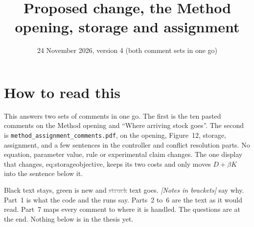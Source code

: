 \documentclass[11pt,a4paper]{article}
\title{Proposed change, the Method opening, storage and assignment}
\date{24 November 2026, version 4 (both comment sets in one go)}
\newcommand{\new}[1]{\textcolor{newc}{#1}}
\newcommand{\old}[1]{\textcolor{gray}{\sout{#1}}}
\newcommand{\note}[1]{{\small\itshape [#1]}}
\newcommand{\lab}[1]{\textsf{\footnotesize #1}}
\begin{document}
\sloppy
\maketitle

\section*{How to read this}
This answers two sets of comments in one go. The first is the ten pasted
comments on the Method opening and ``Where arriving stock goes''. The
second is \texttt{method\_assignment\_comments.pdf}, on the opening,
Figure~12, storage, assignment, and a few sentences in the controller and
conflict resolution parts. No equation, parameter value, rule or
experimental claim changes. The one display that changes,
\lab{eq:storageobjective}, keeps its two costs and only moves $D+\beta K$
into the sentence below it.

Black text stays, \new{green} is new and \old{struck} text goes.
\note{Notes in brackets} say why. Part~1 is what the code and the runs
say. Parts~2 to~6 are the text as it would read. Part~7 maps every comment
to where it is handled. The questions are at the end. Nothing below is in
the thesis yet.
\end{document}
